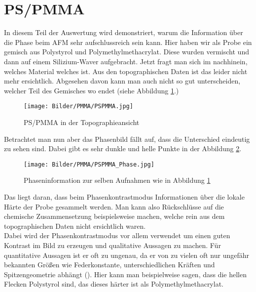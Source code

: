 \clearpage
\section{PS/PMMA}

In diesem Teil der Auswertung wird demonstriert, warum die Information über die Phase beim AFM sehr aufschlussreich sein kann. Hier haben wir 
als Probe ein gemisch aus Polystyrol und Polymethylmethacrylat. Diese wurden vermischt und dann auf einem Silizium-Waver aufgebracht. 
Jetzt fragt man sich im nachhinein, welches Material welches ist. Aus den topographischen Daten ist das leider nicht mehr ersichtlich. Abgesehen davon kann man auch 
nicht so gut unterscheiden, welcher Teil des Gemisches wo endet (siehe Abbildung \ref{PMMA1}.)\\
\begin{figure}[h]
    \centering
    \texttt{[image: Bilder/PMMA/PSPMMA.jpg]}
    \caption{PS/PMMA in der Topographieansicht}
    \label{PMMA1}
\end{figure}

Betrachtet man nun aber das Phasenbild fällt auf, dass die Unterschied eindeutig zu sehen sind. Dabei gibt es sehr dunkle und helle Punkte 
in der Abbildung \ref{PMMA2}.\\

\begin{figure}
    \centering
    \texttt{[image: Bilder/PMMA/PSPMMA\_Phase.jpg]}
    \caption{Phaseninformation zur selben Aufnahmen wie in Abbildung \ref{PMMA1}}
    \label{PMMA2}
\end{figure}

Das liegt daran, dass beim Phasenkontrastmodus Informationen über die lokale Härte der Probe gesammelt werden. Man kann also 
Rückschlüsse auf die chemische Zusammensetzung beispielsweise machen, welche rein aus dem topographischen Daten nicht ersichtlich waren.\\
Dabei wird der Phasenkontrastmodus vor allem verwendet um einen guten Kontrast im Bild zu erzeugen und qualitative Aussagen zu machen. 
Für quantitative Aussagen ist er oft zu ungenau, da er von zu vielen oft nur ungefähr bekannten Größen wie Federkonstante, unterschiedlichen Kräften und Spitzengeometrie 
abhängt (\cite[S.68]{SampleKit2007}).
Hier kann man beispielweise sagen, dass die hellen Flecken Polystyrol sind, das dieses härter ist als Polymethylmethacrylat\footnotemark.
